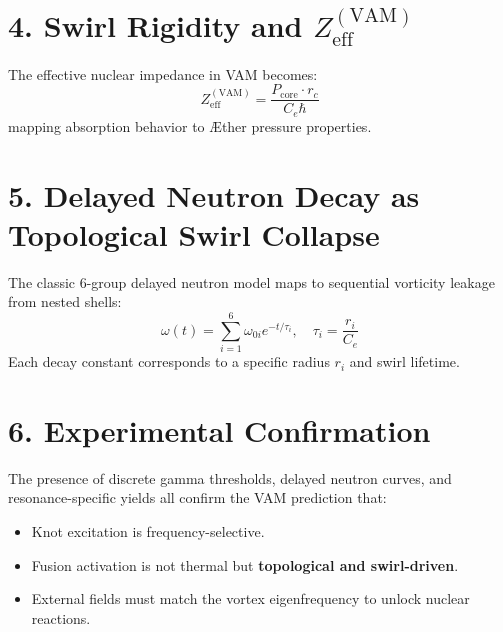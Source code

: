 \documentclass{article}
\begin{document}
\section*{4. Swirl Rigidity and $Z_{\mathrm{eff}}^{(\mathrm{VAM})}$}
The effective nuclear impedance in VAM becomes:
\[
Z_{\mathrm{eff}}^{(\mathrm{VAM})} = \frac{P_{\mathrm{core}} \cdot r_c}{C_e \hbar}
\]
mapping absorption behavior to Æther pressure properties.
\section*{5. Delayed Neutron Decay as Topological Swirl Collapse}
The classic 6-group delayed neutron model maps to sequential vorticity leakage from nested shells:
\[
\omega(t) = \sum_{i=1}^6 \omega_{0i} e^{-t/\tau_i}, \quad \tau_i = \frac{r_i}{C_e}
\]
Each decay constant corresponds to a specific radius $r_i$ and swirl lifetime.
\section*{6. Experimental Confirmation}
The presence of discrete gamma thresholds, delayed neutron curves, and resonance-specific yields all confirm the VAM prediction that:
\begin{itemize}
  \item Knot excitation is frequency-selective.
  \item Fusion activation is not thermal but \textbf{topological and swirl-driven}.
  \item External fields must match the vortex eigenfrequency to unlock nuclear reactions.
\end{itemize}
\end{document}
